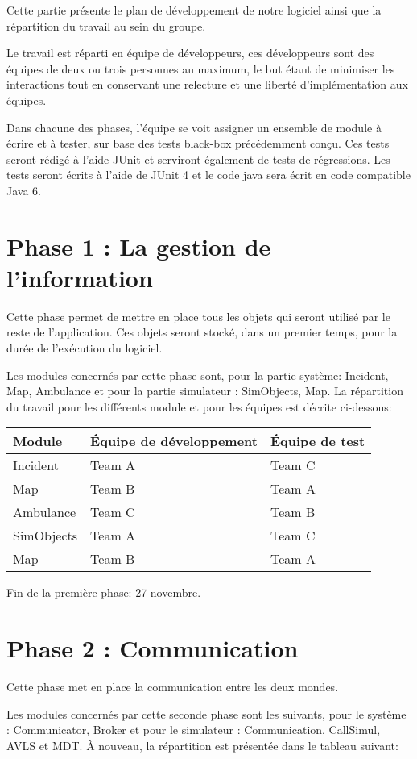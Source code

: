 Cette partie présente le plan de développement de notre logiciel ainsi que
la répartition du travail au sein du groupe.

Le travail est réparti en équipe de développeurs, ces développeurs sont des
équipes de deux ou trois personnes au maximum, le but étant de minimiser les 
interactions tout en conservant une relecture et une liberté d'implémentation
aux équipes.

Dans chacune des phases, l'équipe se voit assigner un ensemble de module à 
écrire et à tester, sur base des tests black-box précédemment conçu. Ces tests
seront rédigé à l'aide JUnit et serviront également de tests de régressions.
Les tests seront écrits à l'aide de JUnit 4 et le code java sera écrit
en code compatible Java 6.

\section{Phase 1 : La gestion de l'information}
Cette phase permet de mettre en place tous les objets qui seront utilisé
par le reste de l'application. Ces objets seront stocké, dans un premier
temps, pour la durée de l'exécution du logiciel.

Les modules concernés par cette phase sont, pour la
partie système: Incident, Map, Ambulance et pour la partie simulateur : SimObjects, Map.
La répartition du travail pour 
les différents module et pour les équipes est décrite ci-dessous:

\noindent\begin{tabularx}{\textwidth}{|l|l|X|}
\hline
Module			& 	Équipe de développement & Équipe de test\\
\hline
Incident	&	Team A 	&	Team C	\\
Map 		&	Team B	&	Team A	\\
Ambulance	&	Team C  &	Team B	\\
SimObjects	&	Team A  &	Team C	\\
Map			&	Team B  &	Team A	\\
\hline
\end{tabularx}

Fin de la première phase: 27 novembre.

\section{Phase 2 : Communication}
Cette phase met en place la communication entre les deux mondes.

Les modules concernés par cette seconde phase sont les suivants, pour
le système : Communicator, Broker et pour le simulateur : Communication, CallSimul, AVLS et MDT.
À nouveau, la répartition est présentée dans le tableau suivant:

